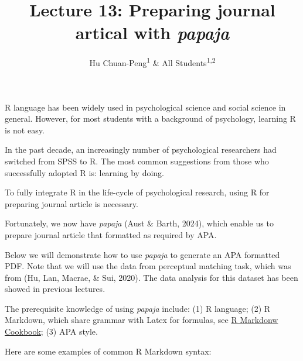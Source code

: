 \documentclass[
  man]{apa6}
\title{Lecture 13: Preparing journal artical with \emph{papaja}}
\author{Hu Chuan-Peng\textsuperscript{1} \& All Students\textsuperscript{1,2}}
\date{}
\affiliation{\vspace{0.5cm}\textsuperscript{1} Nanjing Normal Unviersity\\\textsuperscript{2} Collaborators' Affiliations}
\begin{document}
\maketitle

R language has been widely used in psychological science and social science in general. However, for most students with a background of psychology, learning R is not easy.

In the past decade, an increasingly number of psychological researchers had switched from SPSS to R. The most common suggestions from those who successfully adopted R is: learning by doing.

To fully integrate R in the life-cycle of psychological research, using R for preparing journal article is necessary.

Fortunately, we now have \emph{papaja} (Aust \& Barth, 2024), which enable us to prepare journal article that formatted as required by APA.

Below we will demonstrate how to use \emph{papaja} to generate an APA formatted PDF. Note that we will use the data from perceptual matching task, which was from (Hu, Lan, Macrae, \& Sui, 2020). The data analysis for this dataset has been showed in previous lectures.

The prerequisite knowledge of using \emph{papaja} include: (1) R language; (2) R Markdown, which share grammar with Latex for formulas, see \href{https://bookdown.org/yihui/rmarkdown-cookbook/}{R Markdonw Cookbook}; (3) APA style.

Here are some examples of common R Markdown syntax:
\end{document}
